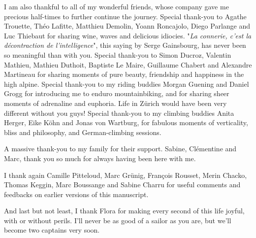I am also thankful to all of my wonderful friends, whose company gave me precious half-times to further continue the journey.
% 
Special thank-you to Agathe Trouette, Théo Lafitte, Matthieu Demolin, Yoann Roncajolo, Diego Parlange and Luc Thiebaut for sharing wine, waves and delicious idiocies. "\textit{La connerie, c'est la décontraction de l'intelligence}", this saying by Serge Gainsbourg, has never been so meaningful than with you.
% 
Special thank-you to Simon Ducroz, Valentin Mathieu, Mathieu Duthoit, Baptiste Le Maire, Guillaume Chabert and Alexandre Martineau for sharing moments of pure beauty, friendship and happiness in the high alpine.
% 
Special thank-you to my riding buddies Morgan Guening and Daniel Grogg for introducing me to enduro mountainbiking, and for sharing sheer moments of adrenaline and euphoria. Life in Zürich would have been very different without you guys! 
% 
Special thank-you to my climbing buddies Anita Herger, Eike Köhn and Jonas von Wartburg, for fabulous moments of verticality, bliss and philosophy, and German-climbing sessions.

A massive thank-you to my family for their support. Sabine, Clémentine and Marc, thank you so much for always having been here with me.

I thank again Camille Pitteloud, Marc Grünig, François Rousset, Merin Chacko, Thomas Keggin, Marc Boussange and Sabine Charru for useful comments and feedbacks on earlier versions of this manuscript.

% 
And last but not least, I thank Flora for making every second of this life joyful, with or without perils.
% 
I'll never be as good of a sailor as you are, but we'll become two captains very soon.











